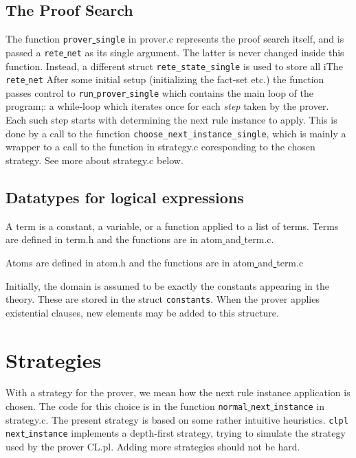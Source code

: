 \documentclass[a4paper]{article}
\begin{document}
\subsection{The Proof Search}
The function \verb|prover|\underline{ }\verb|single| in prover.c represents the proof search itself, and is passed a \verb|rete|\underline{ }\verb|net| as its single argument. The latter is never changed inside this function. Instead, a different struct \verb|rete_state_single| is used to store all iThe \verb|rete|\underline{ }\verb|net| After some initial setup (initializing the fact-set etc.) the function passes control to  \verb|run|\underline{ }\verb|prover|\underline{ }\verb|single| which contains the main loop of the program;: a while-loop which iterates once for each \emph{step} taken by the prover. Each such step starts with determining the next rule instance to apply. This is done by a call to the function \verb|choose_next_instance_single|, which is mainly a wrapper to a call to the function in strategy.c coresponding to the chosen strategy. See more about strategy.c below.

\subsection{Datatypes for logical expressions}
A term is a constant, a variable, or a function applied to a list of terms. Terms are defined in term.h and the functions are in atom\underline{ }and\underline{ }term.c. 

Atoms are defined in atom.h and the functions are in atom\underline{ }and\underline{ }term.c

Initially, the domain is assumed to be exactly the constants appearing in the theory. These are stored in the struct \verb|constants|. When the prover applies existential clauses, new elements may be added to this structure. 

\section{Strategies}
With a strategy for the prover, we mean how the next rule instance application is chosen. The code for this choice is in the function \verb|normal|\underline{ }\verb|next|\underline{ }\verb|instance| in strategy.c. The present strategy is based on some rather intuitive heuristics. \verb|clpl|\underline{ }\verb|next|\underline{ }\verb|instance| implements a depth-first strategy, trying to simulate the strategy used by the prover CL.pl. Adding more strategies should not be hard.
\end{document}
